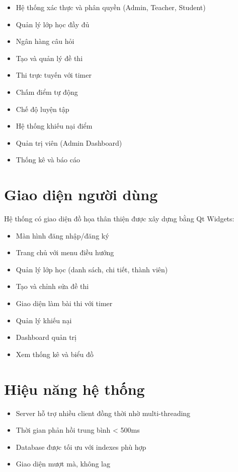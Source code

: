 ﻿\documentclass[12pt,a4paper]{report}
\begin{document}
\begin{itemize}
    \item [$\checkmark$] Hệ thống xác thực và phân quyền (Admin, Teacher, Student)
    \item [$\checkmark$] Quản lý lớp học đầy đủ
    \item [$\checkmark$] Ngân hàng câu hỏi
    \item [$\checkmark$] Tạo và quản lý đề thi
    \item [$\checkmark$] Thi trực tuyến với timer
    \item [$\checkmark$] Chấm điểm tự động
    \item [$\checkmark$] Chế độ luyện tập
    \item [$\checkmark$] Hệ thống khiếu nại điểm
    \item [$\checkmark$] Quản trị viên (Admin Dashboard)
    \item [$\checkmark$] Thống kê và báo cáo
\end{itemize}

\section{Giao diện người dùng}

Hệ thống có giao diện đồ họa thân thiện được xây dựng bằng Qt Widgets:

\begin{itemize}
    \item Màn hình đăng nhập/đăng ký
    \item Trang chủ với menu điều hướng
    \item Quản lý lớp học (danh sách, chi tiết, thành viên)
    \item Tạo và chỉnh sửa đề thi
    \item Giao diện làm bài thi với timer
    \item Quản lý khiếu nại
    \item Dashboard quản trị
    \item Xem thống kê và biểu đồ
\end{itemize}

\section{Hiệu năng hệ thống}

\begin{itemize}
    \item Server hỗ trợ nhiều client đồng thời nhờ multi-threading
    \item Thời gian phản hồi trung bình < 500ms
    \item Database được tối ưu với indexes phù hợp
    \item Giao diện mượt mà, không lag
\end{itemize}
\end{document}
